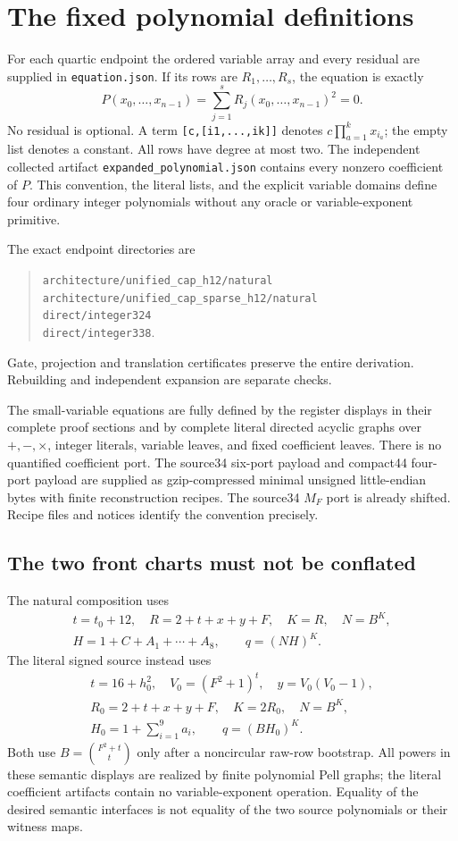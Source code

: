 \section{The fixed polynomial definitions}
For each quartic endpoint the ordered variable array and every residual are supplied in \nolinkurl{equation.json}. If its rows are $R_1,\ldots,R_s$, the equation is exactly
\[
 P(x_0,\ldots,x_{n-1})=\sum_{j=1}^{s}R_j(x_0,\ldots,x_{n-1})^2=0.
\]
No residual is optional. A term \nolinkurl{[c,[i1,...,ik]]} denotes $c\prod_{a=1}^k x_{i_a}$; the empty list denotes a constant. All rows have degree at most two. The independent collected artifact \nolinkurl{expanded_polynomial.json} contains every nonzero coefficient of $P$. This convention, the literal lists, and the explicit variable domains define four ordinary integer polynomials without any oracle or variable-exponent primitive.

The exact endpoint directories are
\begin{quote}\small
\nolinkurl{architecture/unified_cap_h12/natural}\\
\nolinkurl{architecture/unified_cap_sparse_h12/natural}\\
\nolinkurl{direct/integer324}\\
\nolinkurl{direct/integer338}.
\end{quote}
Gate, projection and translation certificates preserve the entire derivation. Rebuilding and independent expansion are separate checks.

The small-variable equations are fully defined by the register displays in their complete proof sections and by complete literal directed acyclic graphs over $+,-,\times$, integer literals, variable leaves, and fixed coefficient leaves. There is no quantified coefficient port. The source34 six-port payload and compact44 four-port payload are supplied as gzip-compressed minimal unsigned little-endian bytes with finite reconstruction recipes. The source34 $M_F$ port is already shifted. Recipe files and notices identify the convention precisely.

\subsection{The two front charts must not be conflated}
The natural composition uses
\[
 \begin{gathered}
 t=t_0+12,\quad R=2+t+x+y+F,\quad K=R,\quad N=B^K,\\
 H=1+C+A_1+\cdots+A_8,\qquad q=(NH)^K.
 \end{gathered}
\]
The literal signed source instead uses
\[
 \begin{gathered}
 t=16+h_0^2,\quad V_0=(F^2+1)^t,\quad y=V_0(V_0-1),\\
 R_0=2+t+x+y+F,\quad K=2R_0,\quad N=B^K,\\
 H_0=1+\sum_{i=1}^9a_i,\qquad q=(BH_0)^K.
 \end{gathered}
\]
Both use $B=\binom{F^2+t}{t}$ only after a noncircular raw-row bootstrap. All powers in these semantic displays are realized by finite polynomial Pell graphs; the literal coefficient artifacts contain no variable-exponent operation. Equality of the desired semantic interfaces is not equality of the two source polynomials or their witness maps.

